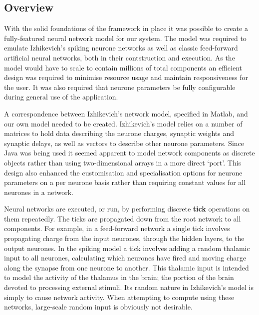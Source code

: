 \documentclass{acm_proc_article-sp}
\begin{document}
\subsection{Overview}
{
With the solid foundations of the framework in place it was possible to create a fully{}-featured neural network model for our system. The model was required to emulate Izhikevich's spiking neurone networks as well as classic feed{}-forward artificial neural networks, both in their contstruction and execution. As the model would have to scale to contain millions of total components an efficient design was required to minimise resource usage and maintain responsiveness for the user. It was also required that neurone parameters be fully configurable during general use of the application.

A correspondence between Izhikevich's network model, specified in Matlab, and our own model needed to be created. Izhikevich's model relies on a number of matrices to hold data describing the neurone charges, synaptic weights and synaptic delays, as well as vectors to describe other neurone parameters. Since Java was being used it seemed apparent to model network components as discrete objects rather than using two-dimensional arrays in a more direct `port'. This design also enhanced the customisation and specialisation options for neurone parameters on a per neurone basis rather than requiring constant values for all neurones in a network. 

Neural networks are executed, or run, by performing discrete {\textbf{tick}} operations on them repeatedly. The ticks are propagated down from the root network to all components. For example, in a feed-forward network a single tick involves propagating charge from the input neurones, through the hidden layers, to the output neurones. In the spiking model a tick involves adding a random thalamic input to all neurones, calculating which neurones have fired and moving charge along the synapse from one neurone to another. This thalamic input is intended to model the activity of the thalamus in the brain; the portion of the brain devoted to processing external stimuli. Its random nature in Izhikevich's model is simply to cause network activity. When attempting to compute using these networks, large{}-scale random input is obviously not desirable.
}
\end{document}
